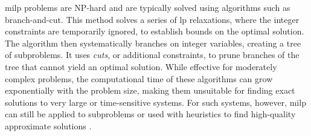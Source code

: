 \gls{milp} problems are NP-hard and are typically solved using algorithms such as branch-and-cut.
This method solves a series of \gls{lp} relaxations, where the integer constraints are temporarily ignored, to establish bounds on the optimal solution.
The algorithm then systematically branches on integer variables, creating a tree of subproblems.
It uses \textit{cuts}, or additional constraints, to prune branches of the tree that cannot yield an optimal solution.
While effective for moderately complex problems, the computational time of these algorithms can grow exponentially with the problem size, making them unsuitable for finding exact solutions to very large or time-sensitive systems.
For such systems, however, \gls{milp} can still be applied to subproblems or used with heuristics to find high-quality approximate solutions \cite{vielma_mixed_2015}.
